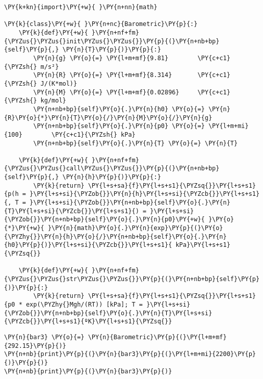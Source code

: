 \begin{tcolorbox}[breakable, size=fbox, boxrule=1pt, pad at break*=1mm,colback=cellbackground, colframe=cellborder]
\begin{Verbatim}[commandchars=\\\{\}]
\PY{k+kn}{import}\PY{+w}{ }\PY{n+nn}{math} 

\PY{k}{class}\PY{+w}{ }\PY{n+nc}{Barometric}\PY{p}{:}
    \PY{k}{def}\PY{+w}{ }\PY{n+nf+fm}{\PYZus{}\PYZus{}init\PYZus{}\PYZus{}}\PY{p}{(}\PY{n+nb+bp}{self}\PY{p}{,} \PY{n}{T}\PY{p}{)}\PY{p}{:}
        \PY{n}{g} \PY{o}{=} \PY{l+m+mf}{9.81}        \PY{c+c1}{\PYZsh{} m/s²}
        \PY{n}{R} \PY{o}{=} \PY{l+m+mf}{8.314}       \PY{c+c1}{\PYZsh{} J/(K*mol)}
        \PY{n}{M} \PY{o}{=} \PY{l+m+mf}{0.02896}     \PY{c+c1}{\PYZsh{} kg/mol}
        \PY{n+nb+bp}{self}\PY{o}{.}\PY{n}{h0} \PY{o}{=} \PY{n}{R}\PY{o}{*}\PY{n}{T}\PY{o}{/}\PY{n}{M}\PY{o}{/}\PY{n}{g}
        \PY{n+nb+bp}{self}\PY{o}{.}\PY{n}{p0} \PY{o}{=} \PY{l+m+mi}{100}        \PY{c+c1}{\PYZsh{} kPa}
        \PY{n+nb+bp}{self}\PY{o}{.}\PY{n}{T} \PY{o}{=} \PY{n}{T}

    \PY{k}{def}\PY{+w}{ }\PY{n+nf+fm}{\PYZus{}\PYZus{}call\PYZus{}\PYZus{}}\PY{p}{(}\PY{n+nb+bp}{self}\PY{p}{,} \PY{n}{h}\PY{p}{)}\PY{p}{:}
        \PY{k}{return} \PY{l+s+sa}{f}\PY{l+s+s1}{\PYZsq{}}\PY{l+s+s1}{p(h = }\PY{l+s+si}{\PYZob{}}\PY{n}{h}\PY{l+s+si}{\PYZcb{}}\PY{l+s+s1}{, T = }\PY{l+s+si}{\PYZob{}}\PY{n+nb+bp}{self}\PY{o}{.}\PY{n}{T}\PY{l+s+si}{\PYZcb{}}\PY{l+s+s1}{) = }\PY{l+s+si}{\PYZob{}}\PY{n+nb+bp}{self}\PY{o}{.}\PY{n}{p0}\PY{+w}{ }\PY{o}{*}\PY{+w}{ }\PY{n}{math}\PY{o}{.}\PY{n}{exp}\PY{p}{(}\PY{o}{\PYZhy{}}\PY{n}{h}\PY{o}{/}\PY{n+nb+bp}{self}\PY{o}{.}\PY{n}{h0}\PY{p}{)}\PY{l+s+si}{\PYZcb{}}\PY{l+s+s1}{ kPa}\PY{l+s+s1}{\PYZsq{}}
    
    \PY{k}{def}\PY{+w}{ }\PY{n+nf+fm}{\PYZus{}\PYZus{}str\PYZus{}\PYZus{}}\PY{p}{(}\PY{n+nb+bp}{self}\PY{p}{)}\PY{p}{:}
        \PY{k}{return} \PY{l+s+sa}{f}\PY{l+s+s1}{\PYZsq{}}\PY{l+s+s1}{p0 * exp(\PYZhy{}Mgh/(RT)) [kPa]; T = }\PY{l+s+si}{\PYZob{}}\PY{n+nb+bp}{self}\PY{o}{.}\PY{n}{T}\PY{l+s+si}{\PYZcb{}}\PY{l+s+s1}{ºK}\PY{l+s+s1}{\PYZsq{}}
\end{Verbatim}
\end{tcolorbox}

\begin{tcolorbox}[breakable, size=fbox, boxrule=1pt, pad at break*=1mm,colback=cellbackground, colframe=cellborder]
\begin{Verbatim}[commandchars=\\\{\}]
\PY{n}{bar3} \PY{o}{=} \PY{n}{Barometric}\PY{p}{(}\PY{l+m+mf}{292.15}\PY{p}{)}
\PY{n+nb}{print}\PY{p}{(}\PY{n}{bar3}\PY{p}{(}\PY{l+m+mi}{2200}\PY{p}{)}\PY{p}{)}
\PY{n+nb}{print}\PY{p}{(}\PY{n}{bar3}\PY{p}{)}
\end{Verbatim}
\end{tcolorbox}

